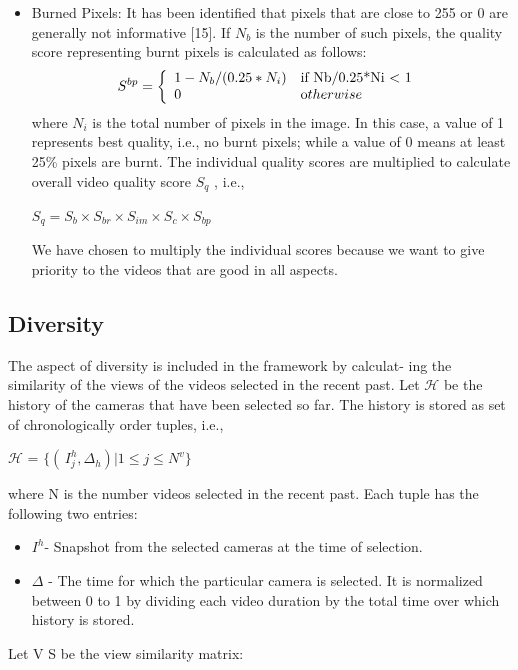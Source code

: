 \documentclass{sig-alternate}
\begin{document}
{{{\begin{itemize}
\item Burned Pixels: It has been identified that pixels that are
close to 255 or 0 are generally not informative [15]. If $N_b$
is the number of such pixels, the quality score representing
burnt pixels is calculated as follows: 
\begin{align*}
S^{bp} =          
\left\{
    \begin{array}{ll}
        1-N_b/(0.25*N_i)  & \mbox{if Nb/{0.25*Ni} < 1 } \\
        0 & \mbox otherwise
    \end{array}
\right.
\end{align*}
where $N_i$ is the total number of pixels in the image. In this
case, a value of 1 represents best quality, i.e., no burnt pixels;
while a value of 0 means at least 25\% pixels are burnt.
The individual quality scores are multiplied to calculate overall
video quality score $S_q$ , i.e.,
\begin{center}
$S_q = S_b \times S_{br} \times S_{im} \times S_c \times S_{bp}$
\end{center}
We have chosen to multiply the individual scores because we
want to give priority to the videos that are good in all aspects.
\end{itemize}




\subsection{Diversity}
The aspect of diversity is included in the framework by calculat-
ing the similarity of the views of the videos selected in the recent
past. Let $\mathcal{H}$ be the history of the cameras that have been selected
so far. The history is stored as set of chronologically order tuples,
i.e.,         
\begin{center}
$\mathcal{H}$ = $\{( \,I_j^h,\Delta_h ) |1 \leq j \leq N^v\}$
\end{center}
where N is the number videos selected in the recent past. Each
tuple has the following two entries:
\begin{itemize}
\item $I^h $- Snapshot from the selected cameras at the time of selection.
\item $\Delta$ - The time for which the particular camera is selected. It
is normalized between 0 to 1 by dividing each video duration
by the total time over which history is stored.
\end{itemize}
Let V S be the view similarity matrix:

}}}
\end{document}
